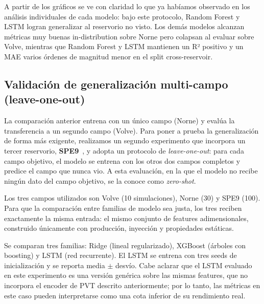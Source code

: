 \documentclass[12pt,a4paper]{article}
\begin{document}
A partir de los gráficos se ve con claridad lo que ya habíamos observado en los análisis
individuales de cada modelo: bajo este protocolo, Random Forest y LSTM logran generalizar al
reservorio no visto. Los demás modelos alcanzan métricas muy buenas in-distribution sobre
Norne pero colapsan al evaluar sobre Volve, mientras que Random Forest y LSTM mantienen un R² positivo y
un MAE varios órdenes de magnitud menor en el split cross-reservoir.

\subsection{Validación de generalización multi-campo (leave-one-out)}
\label{sec:lofo}

La comparación anterior entrena con un único campo (Norne) y evalúa la transferencia a un
segundo campo (Volve). Para poner a prueba la generalización de forma más exigente,
realizamos un segundo experimento que incorpora un tercer reservorio, \textbf{SPE9}~\cite{spe9}, y
adopta un protocolo de \textit{leave-one-out}: para cada campo objetivo, el modelo se
entrena con los otros dos campos completos y predice el campo que nunca vio. A esta
evaluación, en la que el modelo no recibe ningún dato del campo objetivo, se la conoce
como \textit{zero-shot}.

Los tres campos utilizados son Volve (10 simulaciones), Norne (30) y SPE9 (100). Para que
la comparación entre familias de modelo sea justa, los tres reciben exactamente la misma
entrada: el mismo conjunto de features adimensionales, construido únicamente con
producción, inyección y propiedades estáticas.

Se comparan tres familias: Ridge (lineal regularizado), XGBoost (árboles con boosting) y
LSTM (red recurrente). El LSTM se entrena con tres seeds de inicialización y se reporta
media $\pm$ desvío. Cabe aclarar que el LSTM evaluado en este experimento es una versión
genérica sobre las mismas features, que no incorpora el encoder de PVT descrito
anteriormente; por lo tanto, las métricas en este caso pueden interpretarse como una cota inferior de su
rendimiento real.
\end{document}
